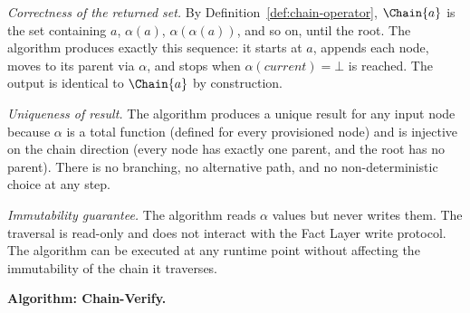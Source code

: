 \textit{Correctness of the returned set.} By Definition~\ref{def:chain-operator}, $\Chain{a}$ is the set containing $a$, $\alpha(a)$, $\alpha(\alpha(a))$, and so on, until the root. The algorithm produces exactly this sequence: it starts at $a$, appends each node, moves to its parent via $\alpha$, and stops when $\alpha(current) = \bot$ is reached. The output is identical to $\Chain{a}$ by construction.

\textit{Uniqueness of result.} The algorithm produces a unique result for any input node because $\alpha$ is a total function (defined for every provisioned node) and is injective on the chain direction (every node has exactly one parent, and the root has no parent). There is no branching, no alternative path, and no non-deterministic choice at any step.

\textit{Immutability guarantee.} The algorithm reads $\alpha$ values but never writes them. The traversal is read-only and does not interact with the Fact Layer write protocol. The algorithm can be executed at any runtime point without affecting the immutability of the chain it traverses.

\medskip
\noindent\textbf{Algorithm: Chain-Verify.}

